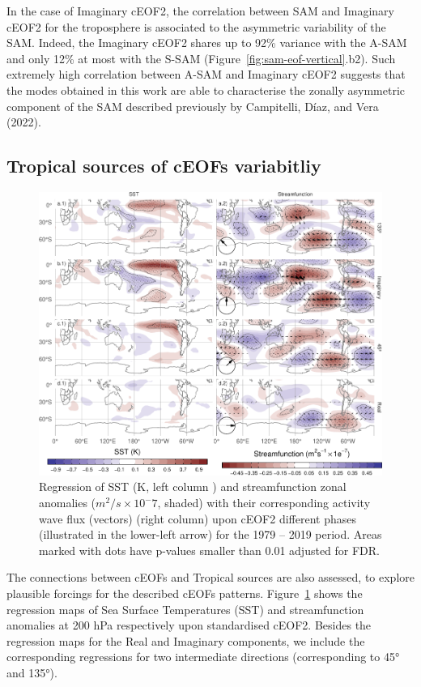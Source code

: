 \documentclass[smallextended]{svjour3}       %
\begin{document}
In the case of Imaginary cEOF2, the correlation between SAM and Imaginary cEOF2 for the troposphere is associated to the asymmetric variability of the SAM.
Indeed, the Imaginary cEOF2 shares up to 92\% variance with the A-SAM and only 12\% at most with the S-SAM (Figure~\ref{fig:sam-eof-vertical}.b2).
Such extremely high correlation between A-SAM and Imaginary cEOF2 suggests that the modes obtained in this work are able to characterise the zonally asymmetric component of the SAM described previously by Campitelli, Díaz, and Vera (2022).

\hypertarget{tropical}{%
\subsection{Tropical sources of cEOFs variabitliy}\label{tropical}}

\begin{figure}
\includegraphics{../figures/sst-psi-2-1} \caption{Regression of SST (K, left column ) and streamfunction zonal anomalies (\(m^2/s\times10^-7\), shaded) with their corresponding activity wave flux (vectors) (right column) upon cEOF2 different phases (illustrated in the lower-left arrow) for the 1979 -- 2019 period. Areas marked with dots have p-values smaller than 0.01 adjusted for FDR.}\label{fig:sst-psi-2}
\end{figure}



The connections between cEOFs and Tropical sources are also assessed, to explore plausible forcings for the described cEOFs patterns.
Figure~\ref{fig:sst-psi-2} shows the regression maps of Sea Surface Temperatures (SST) and streamfunction anomalies at 200 hPa respectively upon standardised cEOF2.
Besides the regression maps for the Real and Imaginary components, we include the corresponding regressions for two intermediate directions (corresponding to 45° and 135°).
\end{document}
